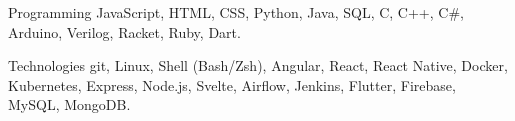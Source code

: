 

\begin{cvskills}

  \cvskill
    {Programming} %
    {JavaScript, HTML, CSS, Python, Java, SQL, C, C++, C\#,  Arduino, Verilog, Racket, Ruby, Dart.} %

  \cvskill
    {Technologies} %
    {git, Linux, Shell (Bash/Zsh), Angular, React, React Native, Docker, Kubernetes, Express, Node.js, Svelte, Airflow, Jenkins, Flutter, Firebase, MySQL, MongoDB.} %


\end{cvskills}
